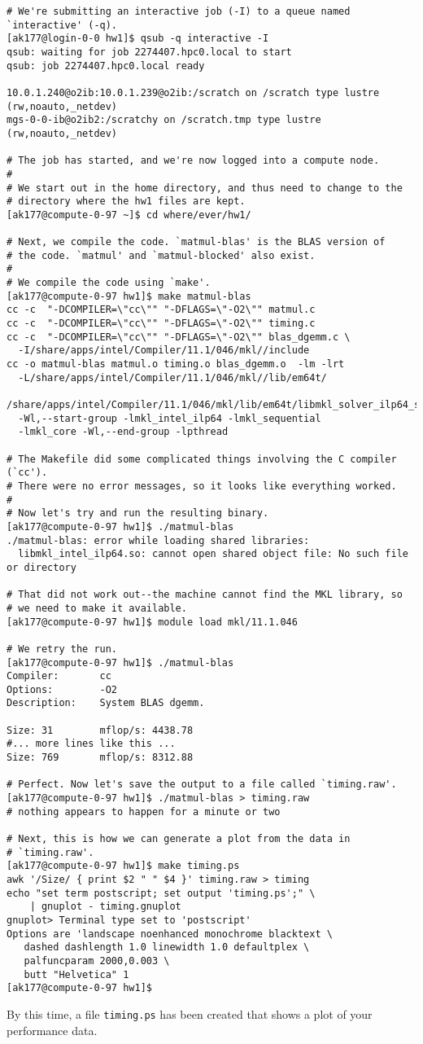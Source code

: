 \documentclass[11pt]{article}
\begin{document}
\begin{lstlisting}
# We're submitting an interactive job (-I) to a queue named `interactive' (-q).
[ak177@login-0-0 hw1]$ qsub -q interactive -I
qsub: waiting for job 2274407.hpc0.local to start
qsub: job 2274407.hpc0.local ready

10.0.1.240@o2ib:10.0.1.239@o2ib:/scratch on /scratch type lustre (rw,noauto,_netdev)
mgs-0-0-ib@o2ib2:/scratchy on /scratch.tmp type lustre (rw,noauto,_netdev)

# The job has started, and we're now logged into a compute node.
#
# We start out in the home directory, and thus need to change to the
# directory where the hw1 files are kept.
[ak177@compute-0-97 ~]$ cd where/ever/hw1/

# Next, we compile the code. `matmul-blas' is the BLAS version of
# the code. `matmul' and `matmul-blocked' also exist.
#
# We compile the code using `make'.
[ak177@compute-0-97 hw1]$ make matmul-blas
cc -c  "-DCOMPILER=\"cc\"" "-DFLAGS=\"-O2\"" matmul.c
cc -c  "-DCOMPILER=\"cc\"" "-DFLAGS=\"-O2\"" timing.c
cc -c  "-DCOMPILER=\"cc\"" "-DFLAGS=\"-O2\"" blas_dgemm.c \
  -I/share/apps/intel/Compiler/11.1/046/mkl//include
cc -o matmul-blas matmul.o timing.o blas_dgemm.o  -lm -lrt 
  -L/share/apps/intel/Compiler/11.1/046/mkl//lib/em64t/ 
  /share/apps/intel/Compiler/11.1/046/mkl/lib/em64t/libmkl_solver_ilp64_sequential.a 
  -Wl,--start-group -lmkl_intel_ilp64 -lmkl_sequential 
  -lmkl_core -Wl,--end-group -lpthread

# The Makefile did some complicated things involving the C compiler (`cc').
# There were no error messages, so it looks like everything worked.
#
# Now let's try and run the resulting binary.
[ak177@compute-0-97 hw1]$ ./matmul-blas 
./matmul-blas: error while loading shared libraries: 
  libmkl_intel_ilp64.so: cannot open shared object file: No such file or directory

# That did not work out--the machine cannot find the MKL library, so
# we need to make it available.
[ak177@compute-0-97 hw1]$ module load mkl/11.1.046

# We retry the run.
[ak177@compute-0-97 hw1]$ ./matmul-blas
Compiler:       cc
Options:        -O2
Description:    System BLAS dgemm.

Size: 31        mflop/s: 4438.78
#... more lines like this ...
Size: 769       mflop/s: 8312.88

# Perfect. Now let's save the output to a file called `timing.raw'.
[ak177@compute-0-97 hw1]$ ./matmul-blas > timing.raw
# nothing appears to happen for a minute or two

# Next, this is how we can generate a plot from the data in
# `timing.raw'.
[ak177@compute-0-97 hw1]$ make timing.ps
awk '/Size/ { print $2 " " $4 }' timing.raw > timing
echo "set term postscript; set output 'timing.ps';" \
    | gnuplot - timing.gnuplot
gnuplot> Terminal type set to 'postscript'
Options are 'landscape noenhanced monochrome blacktext \
   dashed dashlength 1.0 linewidth 1.0 defaultplex \
   palfuncparam 2000,0.003 \
   butt "Helvetica" 1
[ak177@compute-0-97 hw1]$
\end{lstlisting}
By this time, a file \texttt{timing.ps} has been created that shows a
plot of your performance data.
\end{document}
